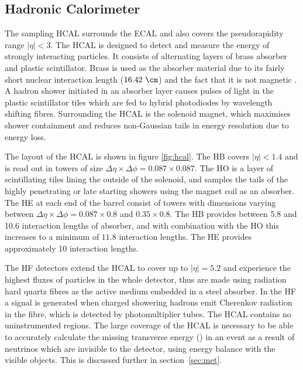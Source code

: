 \subsection{Hadronic Calorimeter}
\label{sec:hcal}

The sampling \ac{HCAL} surrounds the \ac{ECAL} \cite{Chatrchyan:2008aa} and also
covers the pseudorapidity range $|\eta|<3$. The
\ac{HCAL} is designed to detect and measure the energy of strongly interacting
particles. It consists of alternating layers of brass absorber and plastic
scintillator. Brass is used as the absorber material due to its fairly short
nuclear interaction length ($16.42~\cm$) and the fact that it is not magnetic
\cite{PDG}. A hadron shower initiated in an absorber layer causes pulses of 
light in the plastic scintillator tiles which are fed to hybrid photodiodes 
by wavelength shifting fibres. Surrounding the \ac{HCAL} is the solenoid magnet,
which maximises shower containment and reduces non-Gaussian tails in energy
resolution due to energy loss. 

The layout of the \ac{HCAL} is shown in figure \ref{fig:hcal}. The \ac{HB}
covers $|\eta|<1.4$ and is read out in towers of size
$\Delta\eta \times \Delta\phi = 0.087\times0.087$. The \ac{HO}
is a layer of scintillating tiles lining the outside of the solenoid, and
samples the tails of the highly penetrating or late starting showers using the magnet coil as an
absorber. The \ac{HE} at each end of the barrel
consist of towers with dimensions varying between $\Delta\eta \times \Delta\phi
= 0.087\times0.8$ and $0.35\times0.8$. The \ac{HB} provides between 5.8 and 10.6
interaction lengths of absorber, and with combination with the \ac{HO} this increases
to a minimum of $11.8$ interaction lengths. The \ac{HE} provides approximately
10 interaction lengths. 

The \ac{HF} detectors extend the \ac{HCAL} to cover up
to $|\eta|=5.2$ and experience the highest fluxes of particles in the whole
detector, thus are made using radiation hard quartz fibres as the active medium
embedded in a steel absorber. In the \ac{HF} a signal is generated when charged
showering hadrons emit Cherenkov radiation in the fibre, which is detected by
photomultiplier tubes. The \ac{HCAL} contains no
uninstrumented regions. The large coverage of the
\ac{HCAL} is necessary to be able to accurately calculate the missing transverse energy
(\MET) in an event as a result of neutrinos which are invisible to the detector,
using energy balance with the visible objects. This is discussed further in
section~\ref{sec:met}.


